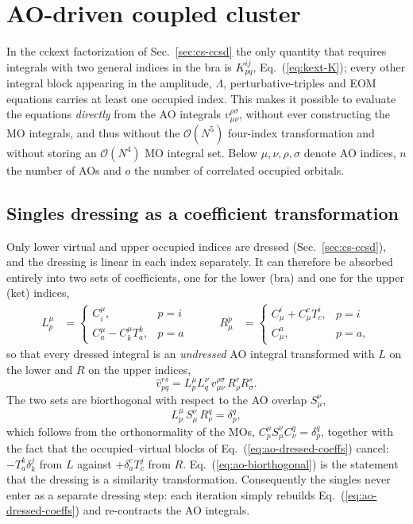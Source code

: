 \documentclass[a4paper,12pt,oneside]{book}
\newcommand{\eq}[1]{Eq.~(\ref{#1})}
\begin{document}
\section{AO-driven coupled cluster} \label{sec:ao-direct}
In the \textsf{cckext} factorization of Sec.~\ref{sec:cs-ccsd} the only quantity that requires integrals
with two general indices in the bra is $K^{ij}_{pq}$, \eq{eq:kext-K}; every other integral block
appearing in the amplitude, $\Lambda$, perturbative-triples and EOM equations carries at least one
occupied index. This makes it possible to evaluate the equations \emph{directly} from the AO
integrals $v_{\mu\nu}^{\rho\sigma}$, without ever constructing the MO integrals, and thus without
the $\mathcal{O}(N^5)$ four-index transformation and without storing an $\mathcal{O}(N^4)$ MO
integral set. Below $\mu,\nu,\rho,\sigma$ denote AO indices, $n$ the number of AOs and $o$ the
number of correlated occupied orbitals.

\subsection{Singles dressing as a coefficient transformation}
Only lower virtual and upper occupied indices are dressed (Sec.~\ref{sec:cs-ccsd}), and the dressing is
linear in each index separately. It can therefore be absorbed entirely into two sets of
coefficients, one for the lower (bra) and one for the upper (ket) indices,
\begin{equation}
\label{eq:ao-dressed-coeffs}
\begin{aligned}
L^\mu_p &= \begin{cases} C^\mu_i, & p = i\\[2pt] C^\mu_a - C^\mu_k T^k_a, & p = a\end{cases}
&\qquad
R_\mu^p &= \begin{cases} C_\mu^i + C_\mu^c T^i_c, & p = i\\[2pt] C_\mu^a, & p = a,\end{cases}
\end{aligned}
\end{equation}
so that every dressed integral is an \emph{undressed} AO integral transformed with $L$ on the lower
and $R$ on the upper indices,
\begin{equation}
\label{eq:ao-dressed-ints}
\hat v_{pq}^{rs} = L^\mu_p L^\nu_q\, v_{\mu\nu}^{\rho\sigma}\, R_\rho^r R_\sigma^s.
\end{equation}
The two sets are biorthogonal with respect to the AO overlap $S_\mu^\nu$,
\begin{equation}
\label{eq:ao-biorthogonal}
L^\mu_p\, S_\mu^\nu\, R_\nu^q = δ_p^q,
\end{equation}
which follows from the orthonormality of the MOs, $C^\mu_p S_\mu^\nu C_\nu^q = δ_p^q$, together
with the fact that the occupied--virtual blocks of \eq{eq:ao-dressed-coeffs} cancel:
$-T^k_a δ_k^j$ from $L$ against $+δ_a^c T^j_c$ from $R$. \eq{eq:ao-biorthogonal} is the statement
that the dressing is a similarity transformation. Consequently the singles never enter as a
separate dressing step: each iteration simply rebuilds \eq{eq:ao-dressed-coeffs} and re-contracts
the AO integrals.
\end{document}
